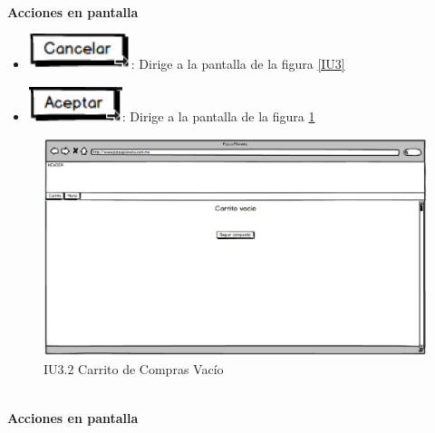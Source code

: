\begin{itemize}
\begin{figure}[h]
\begin{center}
		\end{center}
		
	\end{figure}
	
	\noindent \textbf{\\Acciones en pantalla}
	
	\begin{itemize}
		
		\item \includegraphics[scale=0.500]{imagenes/iconografia/Cancelar.png}: Dirige a la pantalla de la figura \ref{IU3}
		\item \includegraphics[scale=0.500]{imagenes/iconografia/Aceptar.png}: Dirige a la pantalla de la figura \ref{IU3.2}
		
	\end{itemize}

\begin{figure}[h]
	
	\begin{center}				
		
		\includegraphics[scale=0.50]{imagenes/IUs/RegistroSolicitantes/iu1-IniciarSesion/IU3-2CarritoDeComprasVacio.png}
		\caption{IU3.2 Carrito de Compras Vacío}
		\label{IU3.2}
		
	\end{center}
	
\end{figure}
	
\noindent \textbf{\\Acciones en pantalla}
	

\end{itemize}
